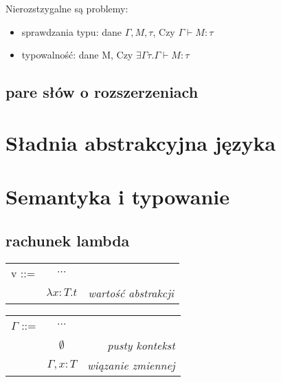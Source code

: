 \documentclass[11pt,leqno]{article}
\begin{document}
Nierozstzygalne są problemy:
    \begin{itemize}
        \item sprawdzania typu: dane $\Gamma, M, \tau$, Czy $\Gamma \vdash M : \tau$
        \item typowalność: dane M, Czy $\exists \Gamma \tau . \Gamma \vdash M : \tau$
    \end{itemize}


\subsection{pare słów o rozszerzeniach}


\section{Sładnia abstrakcyjna języka}
\setcounter{equation}{0}



\section{Semantyka i typowanie}                                 
\setcounter{equation}{0}


\subsection{rachunek lambda}



\begin{tabular}{ l c r }
  v ::= & $\cdots$ &  \\
   & $\lambda x:T.t$ & \textit{wartość abstrakcji} \\
\end{tabular}



\begin{tabular}{ l c r }
  $\Gamma$ ::= & $\cdots$ &  \\
   & $\emptyset$ & \textit{pusty kontekst} \\
   & $\Gamma,x:T$& \textit{wiązanie zmiennej} \\ 
\end{tabular}
\end{document}
